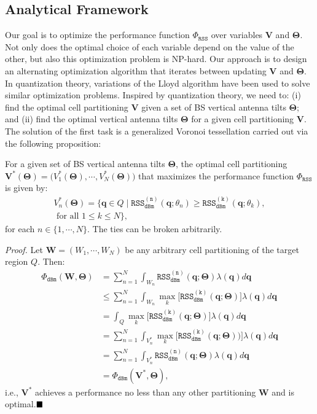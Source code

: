 \subsection{Analytical Framework}\label{RSS-Analytical-Framework}

Our goal is to optimize the performance function $\Phi_{\mathtt{RSS}}$ over variables $\bm{V}$ and $\bm{\Theta}$. Not only does the optimal choice of each variable depend on the value of the other, but also this optimization problem is NP-hard. Our approach is to design an alternating optimization algorithm that iterates between updating $\bm{V}$ and $\bm{\Theta}$. 
In quantization theory, variations of the Lloyd algorithm \cite{lloyd1982least, gray1998quantization} have been used to solve similar optimization problems. Inspired by quantization theory, we need to: (i) find the optimal cell partitioning $\bm{V}$ given a set of BS vertical antenna tilts $\bm{\Theta}$; and (ii) find the optimal vertical antenna tilts $\bm{\Theta}$ for a given cell partitioning $\bm{V}$. The solution of the first task is a generalized Voronoi tessellation \cite{boots2009spatial, du1999centroidal} carried out via the following proposition:
\begin{Proposition}\label{optimal-V}
For a given set of BS vertical antenna tilts $\bm{\Theta}$, the optimal cell partitioning $\bm{V}^*(\bm{\Theta}) = \big(V_1^*(\bm{\Theta}), \cdots, V_N^*(\bm{\Theta})\big)$ that maximizes the performance function $\Phi_{\mathtt{RSS}}$ is given by:
\begin{multline}\label{optimal-cell-partitioning}
    V_n^*(\bm{\Theta}) = \big\{\bm{q} \in Q \mid \mathtt{RSS_{dBm}^{(n)}}(\bm{q}; \theta_n) \geq \mathtt{RSS_{dBm}^{(k)}}(\bm{q}; \theta_k), \\ \textrm{ for all } 1 \leq k \leq N \big\},
\end{multline}
for each $n \in \{1, \cdots, N\}$. The ties can be broken arbitrarily.
\end{Proposition}
\textit{Proof. }Let $\bm{W} = (W_1, \cdots, W_N)$ be any arbitrary cell partitioning of the target region $Q$. Then: 
\begin{align*}
    \Phi_{\mathtt{dBm}}(\bm{W},\bm{\Theta}) &= \sum_{n=1}^{N} \int_{W_n} \mathtt{RSS_{dBm}^{(n)}} (\bm{q}; \bm{\Theta}) \lambda(\bm{q}) d\bm{q} \\& \leq \sum_{n=1}^{N} \int_{W_n} \max_k \Big[\mathtt{RSS_{dBm}^{(k)}} (\bm{q}; \bm{\Theta})\Big] \lambda(\bm{q}) d\bm{q} \\
    &=\int_Q \max_k \Big[\mathtt{RSS_{dBm}^{(k)}} (\bm{q}; \bm{\Theta})\Big] \lambda(\bm{q}) d\bm{q} \\&=\sum_{n=1}^{N} \int_{V_n^*} \max_k \Big[\mathtt{RSS_{dBm}^{(k)}} (\bm{q}; \bm{\Theta}))\Big] \lambda(\bm{q}) d\bm{q} \\
    &=\sum_{n=1}^{N} \int_{V_n^*} \mathtt{RSS_{dBm}^{(n)}} (\bm{q}; \bm{\Theta}) \lambda(\bm{q}) d\bm{q} \\&= \Phi_{\mathtt{dBm}}(\bm{V}^*, \bm{\Theta}),
\end{align*}
i.e., $\bm{V}^*$ achieves a performance no less than any other partitioning $\bm{W}$ and is optimal.$\hfill\blacksquare$


